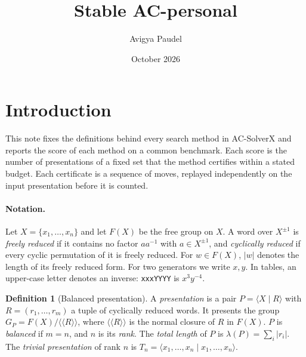 \documentclass[11pt]{article}
\title{Stable AC-personal}
\author{Avigya Paudel}
\date{October 2026}
\theoremstyle{definition}
\newtheorem{definition}[theorem]{Definition}
\theoremstyle{remark}
\newcommand{\F}{F}
\newcommand{\nc}[1]{\langle\!\langle #1 \rangle\!\rangle}
\newcommand{\pres}[2]{\langle #1 \mid #2 \rangle}
\begin{document}
\maketitle

\section{Introduction}

This note fixes the definitions behind every search method in AC-SolverX and reports the score of each method on a
common benchmark. Each score is the number of presentations of a fixed set that the method certifies within a stated
budget. Each certificate is a sequence of moves, replayed independently on the input presentation before it is
counted.

\paragraph{Notation.} Let $X=\{x_1,\dots,x_n\}$ and let $\F(X)$ be the free group on $X$. A word over
$X^{\pm1}$ is \emph{freely reduced} if it contains no factor $aa^{-1}$ with $a\in X^{\pm1}$, and \emph{cyclically
reduced} if every cyclic permutation of it is freely reduced. For $w\in \F(X)$, $|w|$ denotes the length of its freely
reduced form. For two generators we write $x,y$. In tables, an upper-case letter denotes an inverse: \texttt{xxxYYYY}
is $x^3y^{-4}$.

\begin{definition}[Balanced presentation]
A \emph{presentation} is a pair $P=\pres{X}{R}$ with $R=(r_1,\dots,r_m)$ a tuple of cyclically reduced words. It
presents the group $G_P=\F(X)/\nc{R}$, where $\nc{R}$ is the normal closure of $R$ in $\F(X)$. $P$ is \emph{balanced}
if $m=n$, and $n$ is its \emph{rank}. The \emph{total length} of $P$ is $\lambda(P)=\sum_{i}|r_i|$. The \emph{trivial
presentation} of rank $n$ is $T_n=\pres{x_1,\dots,x_n}{x_1,\dots,x_n}$.
\end{definition}
\end{document}
